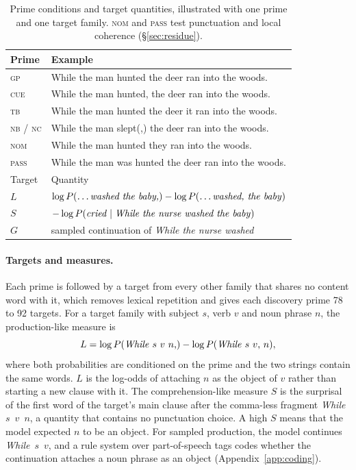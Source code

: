 \documentclass[11pt]{article}
\newcommand{\ex}[1]{\textit{#1}}
\newcommand{\cond}[1]{\textsc{#1}}
\begin{document}
\begin{table}[t]
\centering\small
\setlength{\tabcolsep}{3pt}
\begin{tabular}{lp{5.7cm}}
\toprule
Prime & Example\\
\midrule
\cond{gp} & While the man hunted the deer ran into the woods.\\
\cond{cue} & While the man hunted, the deer ran into the woods.\\
\cond{tb} & While the man hunted the deer it ran into the woods.\\
\cond{nb} / \cond{nc} & While the man slept(,) the deer ran into the woods.\\
\cond{nom} & While the man hunted they ran into the woods.\\
\cond{pass} & While the man was hunted the deer ran into the woods.\\
\midrule
Target & Quantity\\
\midrule
$L$ & $\log P(\text{\ex{\ldots washed the baby,}}) - \log P(\text{\ex{\ldots washed, the baby}})$\\
$S$ & $-\log P(\text{\ex{cried}} \mid \text{\ex{While the nurse washed the baby}})$\\
$G$ & sampled continuation of \ex{While the nurse washed}\\
\bottomrule
\end{tabular}
\caption{Prime conditions and target quantities, illustrated with one prime and one target family. \cond{nom} and \cond{pass} test punctuation and local coherence (\S\ref{sec:residue}).}
\label{tab:conds}
\end{table}

\paragraph{Targets and measures.}
Each prime is followed by a target from every other family that shares no content word with it, which removes lexical repetition and gives each discovery prime 78 to 92 targets.
For a target family with subject $s$, verb $v$ and noun phrase $n$, the production-like measure is
\begin{equation}
L = \log P(\text{\ex{While}}\ s\ v\ n\text{,}) - \log P(\text{\ex{While}}\ s\ v\text{,}\ n),
\end{equation}
where both probabilities are conditioned on the prime and the two strings contain the same words.
$L$ is the log-odds of attaching $n$ as the object of $v$ rather than starting a new clause with it.
The comprehension-like measure $S$ is the surprisal of the first word of the target's main clause after the comma-less fragment \ex{While}~$s$~$v$~$n$, a quantity that contains no punctuation choice.
A high $S$ means that the model expected $n$ to be an object.
For sampled production, the model continues \ex{While}~$s$~$v$, and a rule system over part-of-speech tags codes whether the continuation attaches a noun phrase as an object (Appendix~\ref{app:coding}).
\end{document}
